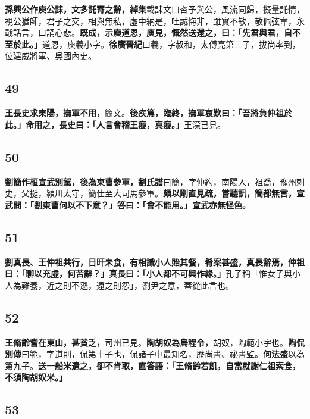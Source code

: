 \textbf{孫興公作庾公誄，文多託寄之辭，}{\footnotesize \textbf{綽集}載誄文曰咨予與公，風流同歸，擬量託情，視公猶師，君子之交，相與無私，虛中納是，吐誠悔非，雖實不敏，敬佩弦韋，永戢話言，口誦心悲。}\textbf{既成，示庾道恩，庾見，慨然送還之，曰：「先君與君，自不至於此。」}{\footnotesize 道恩，庾羲小字。\textbf{徐廣晉紀}曰羲，字叔和，太傅亮第三子，拔尚率到，位建威將軍、吳國內史。}

\subsection*{49}

\textbf{王長史求東陽，撫軍不用，}{\footnotesize 簡文。}\textbf{後疾篤，臨終，撫軍哀歎曰：「吾將負仲祖於此。」命用之，長史曰：「人言會稽王癡，真癡。」}{\footnotesize 王濛已見。}

\subsection*{50}

\textbf{劉簡作桓宣武別駕，後為東曹參軍，}{\footnotesize \textbf{劉氏譜}曰簡，字仲約，南陽人，祖喬，豫州刺史，父挺，潁川太守，簡仕至大司馬參軍。}\textbf{頗以剛直見疏，嘗聽訊，簡都無言，宣武問：「劉東曹何以不下意？」答曰：「會不能用。」宣武亦無怪色。}

\subsection*{51}

\textbf{劉真長、王仲祖共行，日旰未食，有相識小人貽其餐，肴案甚盛，真長辭焉，仲祖曰：「聊以充虛，何苦辭？」真長曰：「小人都不可與作緣。」}{\footnotesize 孔子稱「惟女子與小人為難養，近之則不遜，遠之則怨」，劉尹之意，蓋從此言也。}

\subsection*{52}

\textbf{王脩齡嘗在東山，甚貧乏，}{\footnotesize 司州已見。}\textbf{陶胡奴為烏程令，}{\footnotesize 胡奴，陶範小字也。\textbf{陶侃別傳}曰範，字道則，侃第十子也，侃諸子中最知名，歷尚書、祕書監。\textbf{何法盛}以為第九子。}\textbf{送一船米遺之，卻不肯取，直答語：「王脩齡若飢，自當就謝仁祖索食，不須陶胡奴米。」}

\subsection*{53}

